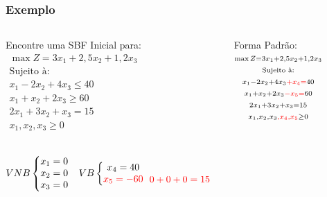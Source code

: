 \documentclass{beamer}
\begin{document}
\begin{frame}
	\frametitle{Exemplo}
	\begin{columns}
		\begin{column}{0.5\textwidth}
			\begin{block}{Encontre uma SBF Inicial para:}
				\centering
				$
					\begin{matrix}
						\scriptstyle \max Z = 3x_1 + 2,5x_2 + 1,2x_3 \\
						\scriptstyle \text{Sujeito à:}\\
						\scriptstyle x_1 -2x_2 + 4x_3 \le 40 \\
						\scriptstyle x_1 +x_2  + 2x_3 \ge 60 \\
						\scriptstyle 2x_1 +3x_2 + x_3 = 15 \\
						\scriptstyle x_1, x_2, x_3 \ge 0 \\
					\end{matrix}
				$
			\end{block}
		\end{column} \pause
		\begin{column}{0.5\textwidth}
			\begin{exampleblock}{Forma Padrão:}
				\centering
				$
					\begin{matrix}
						\scriptstyle \max Z = 3x_1 + 2,5x_2 + 1,2x_3 \\
						\scriptstyle \text{Sujeito à:}\\
						\scriptstyle x_1 -2x_2 + 4x_3 {\color{red}+x_4 =} 40 \\
						\scriptstyle x_1 +x_2  + 2x_3 {\color{red}-x_5=} 60 \\
						\scriptstyle 2x_1 +3x_2 + x_3 = 15 \\
						\scriptstyle x_1, x_2, x_3{\color{red},x_4,x_5} \ge 0 \\
					\end{matrix}
				$
			\end{exampleblock}
		\end{column} \pause
	\end{columns}

	\vspace{0.8cm}

	\begin{columns}
		\begin{column}{0.5\textwidth}
			$
				\begin{matrix}
					VNB \left\{
								\begin{matrix}
												x_1 = 0 \\
												x_2 = 0 \\
												x_3 = 0 \\
								\end{matrix} 
						\right. &
					VB \left\{
								\begin{matrix}
												x_4 = 40 \\
												{\color{red} x_5 = -60} \\
								\end{matrix} 
						\right. \\		
					 &  \\				
				\end{matrix}
			$
			$ {\color{red}0 + 0 + 0 = 15}  $
			

\end{column}
\end{columns}
\end{frame}
\end{document}
